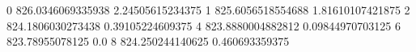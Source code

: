 0 826.0346069335938 2.24505615234375
1 825.6056518554688 1.81610107421875
2 824.1806030273438 0.39105224609375
4 823.8880004882812 0.09844970703125
6 823.78955078125 0.0
8 824.250244140625 0.460693359375
